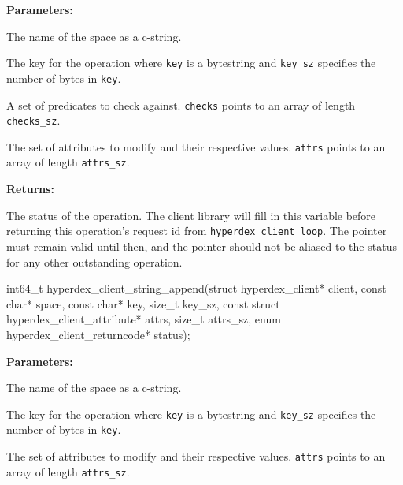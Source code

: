 \noindent\textbf{Parameters:}
\begin{description}[labelindent=\widthof{{\texttt{checks}, \texttt{checks\_sz}}},leftmargin=*,noitemsep,nolistsep,align=right]
\item[\texttt{space}] The name of the space as a c-string.
\item[\texttt{key}, \texttt{key\_sz}] The key for the operation where \texttt{key} is a bytestring and \texttt{key\_sz} specifies the number of bytes in \texttt{key}.
\item[\texttt{checks}, \texttt{checks\_sz}] A set of predicates to check against.  \texttt{checks} points to an array of length \texttt{checks\_sz}.
\item[\texttt{attrs}, \texttt{attrs\_sz}] The set of attributes to modify and their respective values.  \texttt{attrs} points to an array of length \texttt{attrs\_sz}.
\end{description}

\noindent\textbf{Returns:}
\begin{description}[labelindent=\widthof{{\texttt{status}}},leftmargin=*,noitemsep,nolistsep,align=right]
\item[\texttt{status}] The status of the operation.  The client library will fill in this variable before returning this operation's request id from \texttt{hyperdex\_client\_loop}.  The pointer must remain valid until then, and the pointer should not be aliased to the status for any other outstanding operation.
\end{description}

\funcsep
{}
\begin{ccode}
int64_t hyperdex_client_string_append(struct hyperdex_client* client,
                const char* space,
                const char* key, size_t key_sz,
                const struct hyperdex_client_attribute* attrs, size_t attrs_sz,
                enum hyperdex_client_returncode* status);
\end{ccode}
\funcdesc 

\noindent\textbf{Parameters:}
\begin{description}[labelindent=\widthof{{\texttt{attrs}, \texttt{attrs\_sz}}},leftmargin=*,noitemsep,nolistsep,align=right]
\item[\texttt{space}] The name of the space as a c-string.
\item[\texttt{key}, \texttt{key\_sz}] The key for the operation where \texttt{key} is a bytestring and \texttt{key\_sz} specifies the number of bytes in \texttt{key}.
\item[\texttt{attrs}, \texttt{attrs\_sz}] The set of attributes to modify and their respective values.  \texttt{attrs} points to an array of length \texttt{attrs\_sz}.
\end{description}

